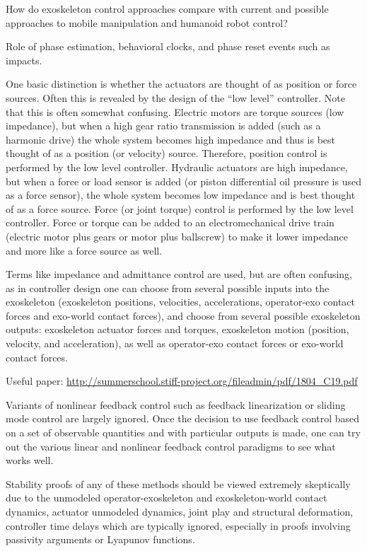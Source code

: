 \documentclass[letterpaper,12pt,fullpage]{article}
\begin{document}
How do exoskeleton control approaches compare with current and
possible approaches to mobile manipulation and humanoid robot control?

Role of phase estimation, behavioral clocks, and phase reset events
such as impacts.

One basic distinction is whether the actuators are thought of as position
or force sources. Often this is revealed by the design of the ``low level''
controller. Note that this is often somewhat confusing. Electric motors
are torque sources (low impedance), but when a high gear ratio transmission
is added (such as a harmonic drive) the whole system becomes high impedance
and thus is best thought of as a position (or velocity) source. Therefore,
position control is performed by the low level controller. Hydraulic actuators
are high impedance, but when a force or load sensor is added (or piston differential
oil pressure is used as a force sensor), the whole system becomes low impedance
and is best thought of as a force source. Force (or joint torque) control is
performed by the low level controller. Force or torque can be added to an
electromechanical drive train (electric motor plus gears or motor plus ballscrew)
to make it lower impedance and more like a force source as well.

Terms like impedance and admittance control are used, but are often confusing,
as in controller design one can choose from several possible
inputs into the exoskeleton (exoskeleton positions,
velocities, accelerations, operator-exo contact forces and
exo-world contact forces), and choose from several possible exoskeleton
outputs: exoskeleton actuator forces and torques, exoskeleton
motion (position, velocity, and acceleration), as well as operator-exo
contact forces or exo-world contact forces.

Useful paper: \url{http://summerschool.stiff-project.org/fileadmin/pdf/1804_C19.pdf}

Variants of nonlinear feedback control such as feedback linearization or
sliding mode control are largely ignored. Once the decision to use feedback control
based on a set of observable quantities and with particular outputs is made,
one can try out the various linear and nonlinear feedback control paradigms
to see what works well.

Stability proofs of any of these methods should be viewed extremely skeptically due
to the unmodeled operator-exoskeleton and exoskeleton-world contact dynamics, 
actuator unmodeled dynamics, joint play and structural deformation, controller
time delays which are typically ignored, especially in proofs involving
passivity arguments or Lyapunov functions.
\end{document}
